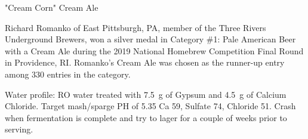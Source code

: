 \stylesection{\stylecreamale}

\begin{recipie}{"Cream Corn" Cream Ale}

\begin{aboutblock}
Richard Romanko of East Pittsburgh, PA, member of the Three Rivers Underground Brewers,
won a silver medal in Category \#1: Pale American Beer with a Cream Ale during the 2019
National Homebrew Competition Final Round in Providence, RI. Romanko's Cream Ale was
chosen as the runner-up entry among 330 entries in the category. 
\end{aboutblock}
 

\begin{methodandtiming}
 
\begin{mashsteps}
\end{mashsteps}

\begin{directions}
Water profile: RO water treated with 7.5~g of Gypsum and 4.5~g of Calcium Chloride.
Target mash/sparge PH of 5.35 Ca 59, Sulfate 74, Chloride 51. Crash when fermentation
is complete and try to lager for a couple of weeks prior to serving.
\end{directions}

\end{methodandtiming}

\pagebreak

\begin{ingredientsblock}

\begin{malts}
\end{malts}

\begin{hops}
\end{hops}

\begin{yeasts}
\end{yeasts}

\end{ingredientsblock}

\end{recipie}
